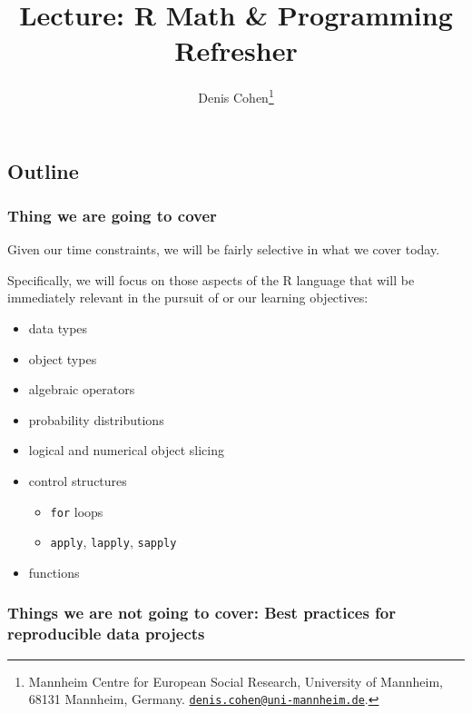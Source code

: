 \documentclass[
  11pt,
]{article}
\title{Lecture: R Math \& Programming Refresher}
\author{Denis Cohen\footnote{Mannheim Centre for European Social Research, University of Mannheim, 68131 Mannheim, Germany. \href{mailto:denis.cohen@uni-mannheim.de}{\nolinkurl{denis.cohen@uni-mannheim.de}}.}}
\date{}
\providecommand{\tightlist}{%
  \setlength{\itemsep}{0pt}\setlength{\parskip}{0pt}}
\begin{document}
\maketitle

\hypertarget{outline}{%
\subsection{Outline}\label{outline}}

\hypertarget{thing-we-are-going-to-cover}{%
\subsubsection{Thing we are going to cover}\label{thing-we-are-going-to-cover}}

Given our time constraints, we will be fairly selective in what we cover today.

Specifically, we will focus on those aspects of the R language that will be
immediately relevant in the pursuit of or our learning objectives:

\begin{itemize}
\tightlist
\item
  data types
\item
  object types
\item
  algebraic operators
\item
  probability distributions
\item
  logical and numerical object slicing
\item
  control structures

  \begin{itemize}
  \tightlist
  \item
    \texttt{for} loops
  \item
    \texttt{apply}, \texttt{lapply}, \texttt{sapply}
  \end{itemize}
\item
  functions
\end{itemize}

\hypertarget{things-we-are-not-going-to-cover-best-practices-for-reproducible-data-projects}{%
\subsubsection{Things we are not going to cover: Best practices for reproducible data projects}\label{things-we-are-not-going-to-cover-best-practices-for-reproducible-data-projects}}
\end{document}
